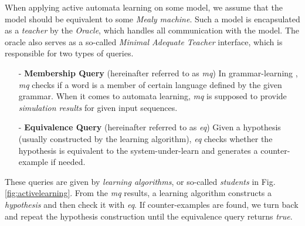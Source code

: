 \documentclass[conference, a4paper]{IEEEtran}
\begin{document}
When applying active automata learning on some model, we assume that the model should be equivalent
to some \emph{Mealy machine}.
Such a model is encapsulated as a \emph{teacher} by the \emph{Oracle}, which handles
all communication with the model. The oracle also serves as a so-called \emph{Minimal Adequate
Teacher} \cite{DBLP:journals/iandc/Angluin87}
interface, which is responsible for two types of queries.

\begin{itemize}
  \item[-] \textbf{Membership Query} (hereinafter referred to as \emph{mq}) In grammar-learning
    \cite{DBLP:journals/iandc/Angluin87}, \emph{mq} checks if a word is a member of certain language
    defined by the given grammar. When it comes to
    automata learning, \emph{mq} is supposed to provide \emph{simulation results} for given input
    sequences.
  \item[-] \textbf{Equivalence Query} (hereinafter referred to as \emph{eq}) Given a hypothesis
    (usually constructed by the learning algorithm), \emph{eq} checks whether the hypothesis is
    equivalent to the system-under-learn and generates a counter-example if needed. 
\end{itemize}

These queries are given by \emph{learning algorithms}, or so-called \emph{students} in Fig.
\ref{fig:activelearning}. From the \emph{mq} results, a learning algorithm constructs a
\emph{hypothesis} and then check it with \emph{eq}. If counter-examples are found, we turn back and
repeat the hypothesis construction until the equivalence query returns \emph{true}.



\end{document}
